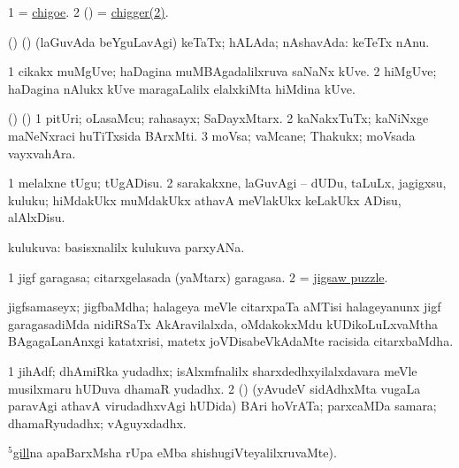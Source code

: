 \bentry
{}
\gl{\nA}
\bmng
\bnum
\num{1} = \hyperref{kandict_c.pdf}{C}{chigoe}{chigoe}. 
\num{2} (\ame) = \hyperref{kandict_c.pdf}{C}{chigger(2)}{chigger(2)}. 
\enum
\emng
\eentry

\bentry
{}
\gl{\gu}
\bmng
(\AmA) (\sw) (laGuvAda beYguLavAgi) keTaTx; hALAda; nAshavAda:  keTeTx nAnu. 
\emng
\eentry

\bentry
{}
\gl{\nA}
\bmng
\bnum
\num{1} cikakx muMgUve; haDagina muMBAgadalilxruva saNaNx kUve. 
\num{2} hiMgUve; haDagina nAlukx kUve maragaLalilx elalxkiMta hiMdina kUve. 
\enum
\emng
\eentry

\bentry
{}
\gl{\nA}
\bmng
(\birx) (\AmA) 
\bnum
\num{1} pitUri; oLasaMcu; rahasayx; SaDayxMtarx. 
\num{2} kaNakxTuTx; kaNiNxge maNeNxraci huTiTxsida BArxMti. 
\num{3} moVsa; vaMcane; Thakukx; moVsada vayxvahAra. 
\enum
\emng
\eentry

\bentry
{}
\gl{\sakirx}
\bmng
\bnum
\num{1} melalxne tUgu; tUgADisu. 
\num{2} sarakakxne, laGuvAgi -- dUDu, taLuLx, jagigxsu, kuluku; hiMdakUkx muMdakUkx athavA meVlakUkx keLakUkx ADisu, alAlxDisu. 
\enum
\emng
\eentry

\bentry
{}
\gl{\gu}
\bmng
kulukuva:  basisxnalilx kulukuva parxyANa. 
\emng
\eentry

\bentry
{}
\gl{\nA}
\bmng
\bnum
\num{1} jigf garagasa; citarxgelasada (yaMtarx) garagasa.   
\num{2}  = \hyperlink{jigsaw puzzle}{jigsaw puzzle}. 
\enum
\emng
\eentry

\bentry
{}
\gl{\nA}
\bmng
jigfsamaseyx; jigfbaMdha; halageya meVle citarxpaTa aMTisi halageyanunx jigf garagasadiMda nidiRSaTx AkAravilalxda, oMdakokxMdu kUDikoLuLxvaMtha BAgagaLanAnxgi katatxrisi, matetx joVDisabeVkAdaMte racisida citarxbaMdha. 
\emng
\eentry

\bentry
{}
\gl{\nA}
\bmng
\bnum
\num{1} jihAdf; dhAmiRka yudadhx; isAlxmfnalilx sharxdedhxyilalxdavara meVle musilxmaru hUDuva dhamaR yudadhx. 
\num{2} (\rUpa) (yAvudeV sidAdhxMta \mo vugaLa paravAgi athavA virudadhxvAgi hUDida) BAri hoVrATa; parxcaMDa samara; dhamaRyudadhx; vAguyxdadhx. 
\enum
\emng
\eentry

\bentry
{}
\gl{\nA}
\bmng
\hyperref{kandict_g.pdf}{G}{gill(5)}{$^5$gill}na apaBarxMsha rUpa  eMba shishugiVteyalilxruvaMte). 
\emng
\eentry

